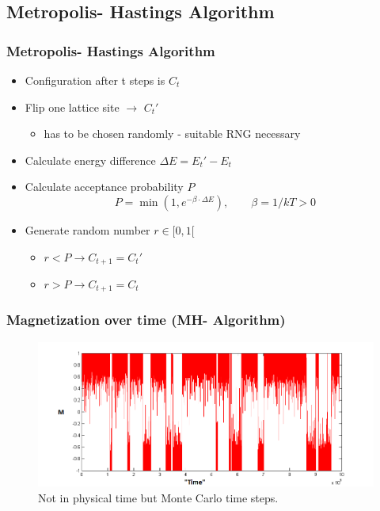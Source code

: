 \documentclass{beamer}
\begin{document}
\subsection{Metropolis- Hastings Algorithm}
\begin{frame}\frametitle{Metropolis- Hastings Algorithm}
\begin{itemize}
\item Configuration after t steps is $C_t$
\item Flip one lattice site $\rightarrow$ $C_t'$
\begin{itemize}
\item  has to be chosen randomly - suitable RNG necessary
\end{itemize}
\item Calculate energy difference $\Delta E = E_t' - E_t$
\item Calculate acceptance probability $P$
\begin{equation*}
P = \operatorname{min}\left(1,e^{-\beta\cdot \Delta E}\right),\qquad \beta = 1/kT > 0 
\end{equation*}
\item Generate random number $r \in [0,1[$
\begin{itemize}
\item $r<P \rightarrow C_{t+1} = C_t'$ 
\item $r>P \rightarrow C_{t+1} = C_t$ 
\end{itemize}
\end{itemize}
\end{frame}

\begin{frame}
\frametitle{Magnetization over time (MH- Algorithm)}
\begin{figure}[h]\begin{center}\includegraphics[width = \textwidth]{./img/MPlot.png}\end{center}\caption{Not in physical time but Monte Carlo time steps.}\end{figure}
\end{frame}
\end{document}
